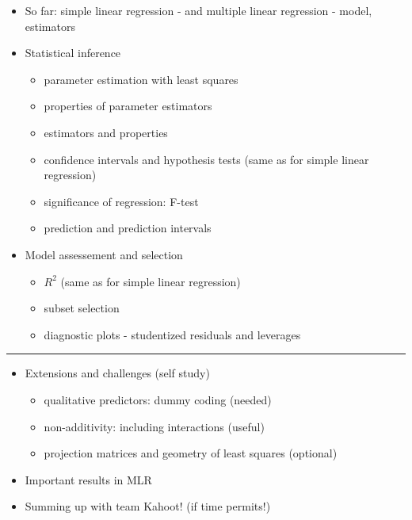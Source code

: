 \documentclass[]{article}
\providecommand{\tightlist}{%
  \setlength{\itemsep}{0pt}\setlength{\parskip}{0pt}}
\begin{document}
\begin{itemize}
\tightlist
\item
  So far: simple linear regression - and multiple linear regression -
  model, estimators
\item
  Statistical inference

  \begin{itemize}
  \tightlist
  \item
    parameter estimation with least squares
  \item
    properties of parameter estimators
  \item
    estimators and properties
  \item
    confidence intervals and hypothesis tests (same as for simple linear
    regression)
  \item
    significance of regression: F-test
  \item
    prediction and prediction intervals
  \end{itemize}
\item
  Model assessement and selection

  \begin{itemize}
  \tightlist
  \item
    \(R^2\) (same as for simple linear regression)
  \item
    subset selection
  \item
    diagnostic plots - studentized residuals and leverages
  \end{itemize}
\end{itemize}

\begin{center}\rule{0.5\linewidth}{\linethickness}\end{center}

\begin{itemize}
\tightlist
\item
  Extensions and challenges (self study)

  \begin{itemize}
  \tightlist
  \item
    qualitative predictors: dummy coding (needed)
  \item
    non-additivity: including interactions (useful)
  \item
    projection matrices and geometry of least squares (optional)
  \end{itemize}
\item
  Important results in MLR
\item
  Summing up with team Kahoot! (if time permits!)
\end{itemize}
\end{document}
